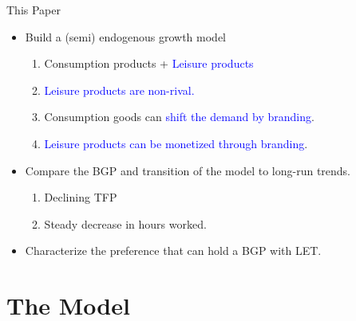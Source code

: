 \documentclass[usenames,dvipsnames,aspectratio=169]{beamer}
\begin{document}
\begin{frame}{This Paper}
\begin{itemize}
    \item Build a (semi) endogenous growth model
    \begin{enumerate}
        \item Consumption products + \textcolor{blue}{Leisure products}
        \item \textcolor{blue}{Leisure products are non-rival.} 
        \item Consumption goods can \textcolor{blue}{shift the demand by branding}. 
        \item \textcolor{blue}{Leisure products can be monetized through branding}.   
    \end{enumerate}
    \pause 
    \item Compare the BGP and transition of the model to long-run trends. 
    \begin{enumerate}
        \item Declining TFP 
        \item Steady decrease in hours worked. 
    \end{enumerate}
    \item Characterize the preference that can hold a BGP with LET. 
\end{itemize}
\end{frame}


\section{The Model}
\end{document}
